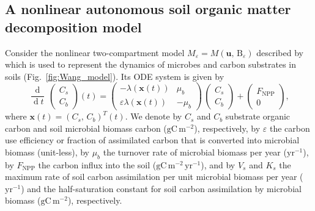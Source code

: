 \documentclass[smallextended]{svjour3}
\renewcommand{\tens}[1]{\mathrm{#1}}
\renewcommand{\vec}[1]{\mathbf{#1}}
\newcommand{\deriv}[1]{\frac{\operatorname{d}}{\operatorname{d}#1}}
\newcommand{\gC}{\mathrm{gC}}
\newcommand{\yr}{\mathrm{yr}}
\newcommand{\meter}{\mathrm{m}}
\newcommand{\transpose}{T}
\newcommand{\NPP}{\ensuremath{\mathrm{NPP}}}
\begin{document}
\subsection{A nonlinear autonomous soil organic matter decomposition model}
\label{sec:example_2}
Consider the nonlinear two-compartment model $M_\varepsilon=M(\vec{u},\,\tens{B}_\varepsilon)$ described by \citet{Wang2014BG} which is used to represent the dynamics of microbes and carbon substrates in soils (Fig.~\ref{fig:Wang_model}). Its ODE system is given by
\begin{equation}
    \deriv{t}\,\begin{pmatrix}C_{s}\\C_{b}\end{pmatrix}(t) = 
    \begin{pmatrix}
      -\lambda(\vec{x}(t)) & \mu_{b}\\
      \varepsilon \lambda(\vec{x}(t)) & - \mu_{b}
    \end{pmatrix}
    \, \begin{pmatrix}C_{s}\\C_{b}\end{pmatrix}
    + \begin{pmatrix}F_{\NPP}\\0\end{pmatrix},
\end{equation}
where $\vec{x}(t)=(C_{s},\,C_{b})^{\transpose}(t)$.
We denote by $C_s$ and $C_b$ substrate organic carbon and soil microbial biomass carbon ($\gC\,\meter^{-2}$), respectively, by $\varepsilon$ the carbon use efficiency or fraction of assimilated carbon that is converted into microbial biomass (unit-less), by $\mu_b$ the turnover rate of microbial biomass per year ($\yr^{-1}$), by $F_{\NPP}$ the carbon influx into the soil ($\gC\,\meter^{-2}\,\yr^{-1}$), and by $V_s$ and $K_s$ the maximum rate of soil carbon assimilation per unit microbial biomass per year ($\yr^{-1}$) and the half-saturation constant for soil carbon assimilation by microbial biomass ($\gC\,\meter^{-2}$), respectively.
\end{document}
